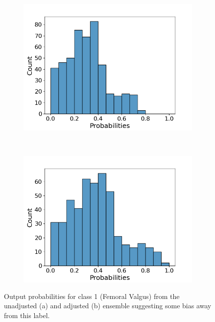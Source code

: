 \begin{figure}[h]
  \centering
  \begin{subfigure}[t]{0.45\textwidth}
  \includegraphics[width=\textwidth]{files/figs/met/probs-1.png}
  \caption{}
  \label{fig:prob-1}
\end{subfigure}
~
\begin{subfigure}[t]{0.45\textwidth}
  \includegraphics[width=\textwidth]{files/figs/met/probs-1-adjusted.png}
  \caption{}
  \label{fig:prob-adjusted}
\end{subfigure}
  \caption{Output probabilities for class 1 (Femoral Valgus) from the unadjusted (a) and adjusted (b) ensemble suggesting some bias away from this label.}
  \label{fig:bias-1}
\end{figure}

